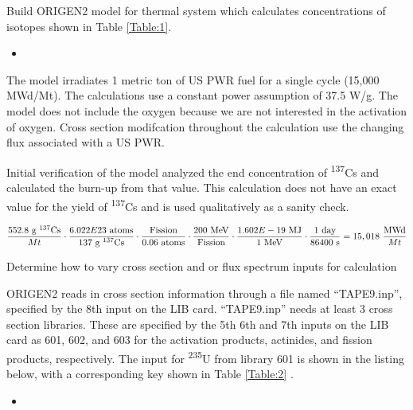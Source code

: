 \documentclass[11pt,notitlepage]{article}
\newcommand{\tss}{\textsuperscript}
\newcommand{\inputdeck}[2]{
\begin{itemize}
\item[]
\end{itemize}
}
\newcommand{\inputdeckpages}[4]{
\begin{itemize}
\item[]
\end{itemize}
}
\newcommand{\cmark}{\ding{51}}%
\newcommand{\done}{\rlap{$\square$}{\raisebox{2pt}{\large\hspace{1pt}\cmark}}%
  \hspace{-2.5pt}}
\begin{document}
\begin{todolist}
\item[\done]{Build ORIGEN2 model for thermal system which
  calculates concentrations of isotopes shown in
  Table \ref{Table:1}.}

  \inputdeck{../Origen2/TAPE5}{PWR Input Deck}

  The model irradiates 1 metric ton of US PWR fuel for a single
  cycle (15,000 MWd/Mt). The calculations use a constant power assumption
  of 37.5 W/g. The model does not include the oxygen because
  we are not interested in the activation of oxygen.
  Cross section modifcation throughout the calculation
  use the changing flux associated with a US PWR. 

  Initial verification of the model analyzed the end concentration of
  \tss{137}Cs and calculated the burn-up from that value. This calculation
  does not have an exact value for the yield of \tss{137}Cs and is
  used qualitatively as a sanity check.

  \begin{equation*}
    \frac{552.8\ \text{g \tss{137}Cs}}{Mt}\cdot
    \frac{6.022E23\ \text{atoms}}{137\ \text{g \tss{137}Cs}}\cdot
    \frac{\text{Fission}}{0.06\ \text{atoms}}\cdot
    \frac{200\ \text{MeV}}{\text{Fission}}\cdot
    \frac{1.602E-19\ \text{MJ}}{1\ \text{MeV}}\cdot
    \frac{1\ \text{day}}{86400\ \text{s}}=15,018\ \frac{\text{MWd}}{Mt}
  \end{equation*}

\item[\done]{Determine how to vary cross section and or flux spectrum
  inputs for calculation}
  
  ORIGEN2 reads in cross section information through a file
  named ``TAPE9.inp'', specified by the 8th input on the LIB card.
  ``TAPE9.inp'' needs at least 3 cross section libraries. These
  are specified by the 5th 6th and 7th inputs on the LIB card as
  601, 602, and 603 for the activation products, actinides, and
  fission products, respectively. The input for \tss{235}U
  from library 601 is shown in the listing below, with
  a corresponding key shown in Table \ref{Table:2} \cite{croff1980user}.
  
  \inputdeckpages{../Origen2/ORIGENBACKUP/TAPE9_BANK}{\tss{235}U cross section
    library 602 input}{3827}{3827}


\end{todolist}
\end{document}
